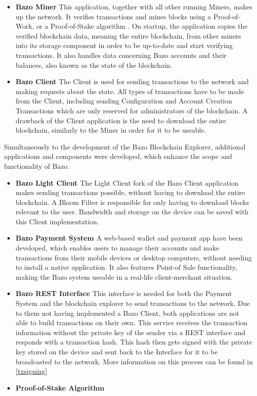 \begin{itemize}
\item \textbf{Bazo Miner}
This application, together with all other running Miners, makes up the network. It verifies transactions and mines blocks using a Proof-of-Work, or a Proof-of-Stake algorithm \cite{pos}. On startup, the application copies the verified blockchain data, meaning the entire blockchain, from other miners into its storage component in order to be up-to-date and start verifying transactions. It also handles data concerning Bazo accounts and their balances, also known as the state of the blockchain.

\item \textbf{Bazo Client}
The Client is used for sending transactions to the network and making requests about the state. All types of transactions have to be made from the Client, including sending Configuration and Account Creation Transactions which are only reserved for administrators of the blockchain. A drawback of the Client application is the need to download the entire blockchain, similarly to the Miner in order for it to be useable.
\end{itemize}

Simultaneously to the development of the Bazo Blockchain Explorer, additional applications and components were developed, which enhance the scope and functionality of Bazo. 

\begin{itemize}
\item \textbf{Bazo Light Client \cite{marc}}
The Light Client fork of the Bazo Client application makes sending transactions possible, without having to download the entire blockchain. A Bloom Filter is responsible for only having to download blocks relevant to the user. Bandwidth and storage on the device can be saved with this Client implementation.
\item \textbf{Bazo Payment System \cite{payment}}
A web-based wallet and payment app have been developed, which enables users to manage their accounts and make transactions from their mobile devices or desktop computers, without needing to install a native application. It also features Point-of Sale functionality, making the Bazo system useable in a real-life client-merchant situation.
\item \textbf{Bazo REST Interface \cite{marc}}
This interface is needed for both the Payment System and the blockchain explorer to send transactions to the network. Due to them not having implemented a Bazo Client, both applications are not able to build transactions on their own. This service receives the transaction information without the private key of the sender via a REST interface and responds with a transaction hash. This hash then gets signed with the private key stored on the device and sent back to the Interface for it to be broadcasted to the network. More information on this process can be found in \ref{txsigning}
\item \textbf{Proof-of-Stake Algorithm \cite{pos}}
\end{itemize}

